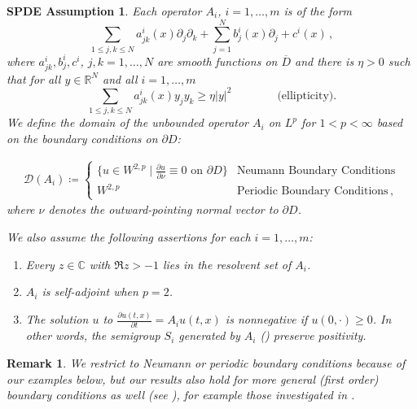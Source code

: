 \documentclass[final]{amsart}
\newtheorem{sass}{SPDE Assumption}[]
\newtheorem{rem}[thm]{Remark}
\numberwithin{thm}{section}
\numberwithin{equation}{section}
\newcommand{\R}{\mathbb{R}}
\newcommand{\Dm}{\mathcal{D}}
\begin{document}
\begin{sass}\label{sass-A}
    Each operator $A_i$, $i = 1, \dots, m$ is of the form
    $$
    \sum_{1 \leq j, k \leq N} a^i_{jk}(x)\partial_j\partial_k + \sum_{j=1}^N b_j^i(x)\partial_j + c^i(x) \,,
    $$
    where $a^i_{jk}, b^i_j, c^i$, $j, k = 1, \dots, N$ are smooth functions on $\overline D$ and there is $\eta > 0$ such that for all $y \in \R^N$ and all $i = 1, \dots, m$
    $$
    \sum_{1 \leq j, k \leq N} a^i_{jk}(x)y_jy_k \geq \eta |y|^2 
    \qquad\qquad \textrm{(ellipticity).}
    $$
    We define the domain of the unbounded operator $A_i$ on $L^p$ for $1 < p < \infty$ based on the boundary conditions on $\partial D$:
    
    
    \begin{align*}
    \Dm(A_i) \coloneqq \begin{cases}
   \{u \in W^{2,p} \mid \frac{\partial u}{\partial \nu} \equiv 0 \text{ on } \partial D\} &  \text{Neumann Boundary Conditions}  \\
 W^{2,p} &  \text{Periodic Boundary Conditions} \,,
\end{cases}
    \end{align*}
where $\nu$ denotes the outward-pointing normal vector to $\partial D$.

We also assume the following assertions  for each $i = 1, \dots, m$:
\begin{enumerate}[label=(\roman*)]
    \item Every $z \in \mathbb{C}$ with $\Re z > -1$ lies in the resolvent set of $A_i$.
    \item $A_i$ is self-adjoint when $p = 2$.
    \item The solution $u$ to $\frac{\partial u(t,x)}{\partial t} = A_iu(t,x)$ is nonnegative if $u(0,\cdot) \geq 0$. In other words, the semigroup $S_i$ generated by $A_i$ () preserve positivity.
\end{enumerate}
\end{sass}

\begin{rem}\label{boundary-cond-is-arb}
    We restrict to Neumann or periodic boundary conditions because of our examples below, but our results also hold for more general (first order) boundary conditions as well (see \cite[(3.1.3),(3.1.4)]{lunardi}), for example those investigated in \cite{allee-effect}.
\end{rem}
\end{document}

